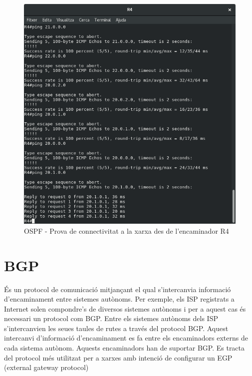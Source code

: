 \documentclass[10pt]{article}
\begin{document}
\begin{figure}[H]
\begin{center}
\includegraphics[scale=0.5]{Images/ospf-R4-conectivity.png}
\caption{OSPF - Prova de connectivitat a la xarxa des de l'encaminador R4}
\end{center}
\end{figure}
\section{BGP}
És un protocol de comunicació mitjançant el qual s'intercanvia informació d'encaminament entre sistemes autònoms. Per exemple, els ISP registrats a Internet solen compondre's de diversos sistemes autònoms i per a aquest cas és necessari un protocol com BGP. Entre els sistemes autònoms dels ISP s'intercanvien les seues taules de rutes a través del protocol BGP. Aquest intercanvi d'informació d'encaminament es fa entre els encaminadors externs de cada sistema autònom. Aquests encaminadors han de suportar BGP. Es tracta del protocol més utilitzat per a xarxes amb intenció de configurar un EGP (external gateway protocol)
\end{document}
